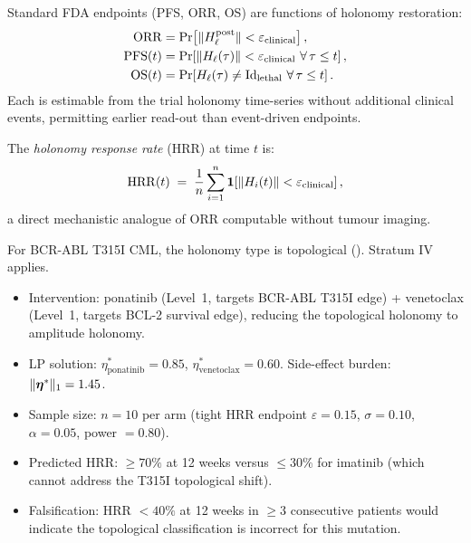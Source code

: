 Standard FDA endpoints (PFS, ORR, OS) are functions of holonomy restoration:
\begin{align}
  \mathrm{ORR}    &= \Pr\!\left[\|H_\ell^{\mathrm{post}}\| < \varepsilon_{\mathrm{clinical}}\right], \\
  \mathrm{PFS}(t) &= \Pr\!\left[\|H_\ell(\tau)\| < \varepsilon_{\mathrm{clinical}}\ \forall\,\tau \leq t\right], \\
  \mathrm{OS}(t)  &= \Pr\!\left[H_\ell(\tau) \neq \mathrm{Id}_{\mathrm{lethal}}\ \forall\,\tau \leq t\right].
\end{align}
Each is estimable from the trial holonomy time-series without additional clinical
events, permitting earlier read-out than event-driven endpoints.

\begin{definition}
\label{def:ch10-survival-bridge}
The \emph{holonomy response rate} (HRR) at time $t$ is:
\[
  \mathrm{HRR}(t) \;=\; \frac{1}{n}\sum_{i=1}^n
  \mathbf{1}\!\left[\|H_i(t)\| < \varepsilon_{\mathrm{clinical}}\right],
\]
a direct mechanistic analogue of ORR computable without tumour imaging.
\end{definition}

\begin{example}
\label{ex:ch10-cml-trial}
For BCR-ABL T315I CML, the holonomy type is topological
().  Stratum IV applies.
\begin{itemize}[leftmargin=2em]
  \item Intervention: ponatinib (Level~1, targets BCR-ABL T315I edge) +
    venetoclax (Level~1, targets BCL-2 survival edge), reducing the topological
    holonomy to amplitude holonomy.
  \item LP solution: $\eta^*_{\mathrm{ponatinib}} = 0.85$,
    $\eta^*_{\mathrm{venetoclax}} = 0.60$.  Side-effect burden: $\|\boldsymbol{\eta}^*\|_1 = 1.45$.
  \item Sample size: $n = 10$ per arm (tight HRR endpoint $\varepsilon = 0.15$,
    $\sigma = 0.10$, $\alpha = 0.05$, power $= 0.80$).
  \item Predicted HRR: $\geq 70\%$ at 12 weeks versus $\leq 30\%$ for imatinib
    (which cannot address the T315I topological shift).
  \item Falsification: HRR $< 40\%$ at 12 weeks in $\geq 3$ consecutive patients
    would indicate the topological classification is incorrect for this mutation.
\end{itemize}
\end{example}

